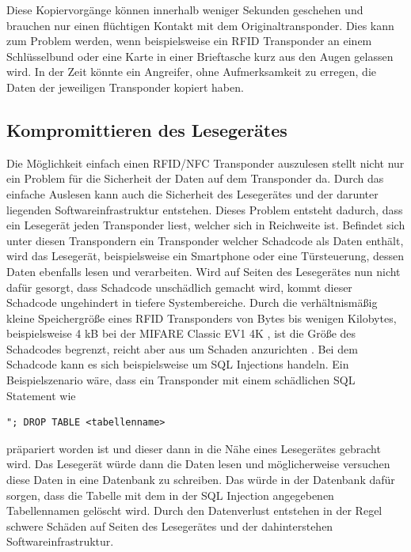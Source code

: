 \documentclass[conference]{IEEEtran}
\begin{document}
Diese Kopiervorgänge können innerhalb weniger Sekunden geschehen und brauchen nur einen flüchtigen Kontakt mit dem Originaltransponder. Dies kann zum Problem werden, wenn beispielsweise ein RFID Transponder an einem Schlüsselbund oder eine Karte in einer Brieftasche kurz aus den Augen gelassen wird. In der Zeit könnte ein Angreifer, ohne Aufmerksamkeit zu erregen, die Daten der jeweiligen Transponder kopiert haben.

\subsection{Kom­pro­mit­tie­ren des Lesegerätes}
Die Möglichkeit einfach einen RFID/NFC Transponder auszulesen stellt nicht nur ein Problem für die Sicherheit der Daten auf dem Transponder da. Durch das einfache Auslesen kann auch die Sicherheit des Lesegerätes und der darunter liegenden Softwareinfrastruktur entstehen. Dieses Problem entsteht dadurch, dass ein Lesegerät jeden Transponder liest, welcher sich in Reichweite ist. Befindet sich unter diesen Transpondern ein Transponder welcher Schadcode als Daten enthält, wird das Lesegerät, beispielsweise ein Smartphone oder eine Türsteuerung, dessen Daten ebenfalls lesen und verarbeiten. Wird auf Seiten des Lesegerätes nun nicht dafür gesorgt, dass Schadcode unschädlich gemacht wird, kommt dieser Schadcode ungehindert in tiefere Systembereiche.
Durch die verhältnismäßig kleine Speichergröße eines RFID Transponders von Bytes bis wenigen Kilobytes, beispielsweise 4 kB bei der MIFARE Classic EV1 4K \cite{b4}, ist die Größe des Schadcodes begrenzt, reicht aber aus um Schaden anzurichten \cite{b5}. Bei dem Schadcode kann es sich beispielsweise um SQL Injections handeln. Ein Beispielszenario wäre, dass ein Transponder mit einem schädlichen SQL Statement wie
\begin{lstlisting}
"; DROP TABLE <tabellenname>
\end{lstlisting}
\cite{b5} präpariert worden ist und dieser dann in die Nähe eines Lesegerätes gebracht wird. Das Lesegerät würde dann die Daten lesen und möglicherweise versuchen diese Daten in eine Datenbank zu schreiben. Das würde in der Datenbank dafür sorgen, dass die Tabelle mit dem in der SQL Injection angegebenen Tabellennamen gelöscht wird. Durch den Datenverlust entstehen in der Regel schwere Schäden auf Seiten des Lesegerätes und der dahinterstehen Softwareinfrastruktur.
\end{document}
